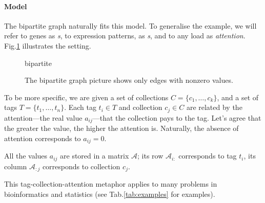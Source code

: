 \documentclass{llncs}
\begin{document}
\paragraph{Model} The bipartite graph naturally fits this model. To generalise the example, we will refer to genes as \textit{{\tag}s}, to expression patterns, as \textit{{\collection}s}, and to any load as \textit{attention}. Fig.\ref{fig:nice_name} illustrates the setting.

\begin{figure}
    \centering
    {bipartite}
    \caption{The bipartite graph picture shows only edges with nonzero values.}
    \label{fig:nice_name}
\end{figure}

To be more specific, we are given a set of collections $C = \{c_1, \dots, c_k\}$, and a set of tags $T = \{t_1, \dots, t_n\}$.
Each tag $t_i \in T$ and collection $c_j \in C$ are related by the attention---the real value $a_{ij}$---that the collection pays to the tag.
Let's agree that the greater the value, the higher the attention is. Naturally, the absence of attention corresponds to $a_{ij} = 0$. 

All the values $a_{ij}$ are stored in a matrix $\mathcal{A}$; its row $\mathcal{A}_{i:}$ corresponds to tag $t_i$, its column $\mathcal{A}_{:j}$ corresponds to collection $c_j$.

This tag-collection-attention metaphor applies to many problems in bioinformatics and statistics (see Tab.\ref{tab:examples} for examples).
\end{document}
